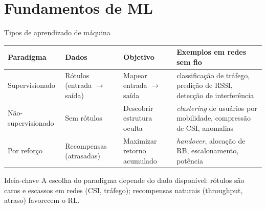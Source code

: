 \documentclass[aspectratio=169,11pt]{beamer}
\begin{document}
\section{Fundamentos de ML}

\begin{frame}{Tipos de aprendizado de máquina}
  \begin{center}
    \scriptsize
    \begin{tabularx}{\textwidth}{@{}lXXX@{}}
      \toprule
      \textbf{Paradigma} & \textbf{Dados} & \textbf{Objetivo} & \textbf{Exemplos em redes sem fio}\\
      \midrule
      Supervisionado & Rótulos (entrada $\to$ saída) & Mapear entrada $\to$ saída & classificação de tráfego, predição de RSSI, detecção de interferência\\
      Não-supervisionado & Sem rótulos & Descobrir estrutura oculta & \emph{clustering} de usuários por mobilidade, compressão de CSI, anomalias\\
      Por reforço & Recompensas (atrasadas) & Maximizar retorno acumulado & \emph{handover}, alocação de RB, escalonamento, potência\\
      \bottomrule
    \end{tabularx}
  \end{center}
  \pause
  \begin{alertblock}{Ideia-chave}
    A escolha do paradigma depende do dado disponível: rótulos são caros e escassos em redes (CSI, tráfego); recompensas naturais (throughput, atraso) favorecem o RL.
  \end{alertblock}
\end{frame}
\end{document}
